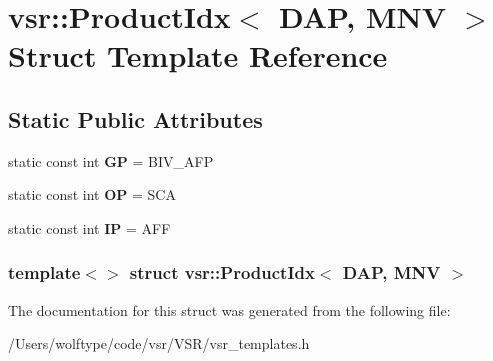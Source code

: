 \hypertarget{structvsr_1_1_product_idx_3_01_d_a_p_00_01_m_n_v_01_4}{\section{vsr\-:\-:Product\-Idx$<$ D\-A\-P, M\-N\-V $>$ Struct Template Reference}
\label{structvsr_1_1_product_idx_3_01_d_a_p_00_01_m_n_v_01_4}
}
\subsection*{Static Public Attributes}
\begin{DoxyCompactItemize}
\item 
\hypertarget{structvsr_1_1_product_idx_3_01_d_a_p_00_01_m_n_v_01_4_ac2e8aabc6ae6cf8a501763a3adcebe10}{static const int {\bfseries G\-P} = B\-I\-V\-\_\-\-A\-F\-P}\label{structvsr_1_1_product_idx_3_01_d_a_p_00_01_m_n_v_01_4_ac2e8aabc6ae6cf8a501763a3adcebe10}

\item 
\hypertarget{structvsr_1_1_product_idx_3_01_d_a_p_00_01_m_n_v_01_4_a236666cd060ecacf8f87864252ea2360}{static const int {\bfseries O\-P} = S\-C\-A}\label{structvsr_1_1_product_idx_3_01_d_a_p_00_01_m_n_v_01_4_a236666cd060ecacf8f87864252ea2360}

\item 
\hypertarget{structvsr_1_1_product_idx_3_01_d_a_p_00_01_m_n_v_01_4_a1596781fd0dac7fd1ba0e2c30095c63f}{static const int {\bfseries I\-P} = A\-F\-F}\label{structvsr_1_1_product_idx_3_01_d_a_p_00_01_m_n_v_01_4_a1596781fd0dac7fd1ba0e2c30095c63f}

\end{DoxyCompactItemize}
\subsubsection*{template$<$$>$ struct vsr\-::\-Product\-Idx$<$ D\-A\-P, M\-N\-V $>$}



The documentation for this struct was generated from the following file\-:\begin{DoxyCompactItemize}
\item 
/\-Users/wolftype/code/vsr/\-V\-S\-R/vsr\-\_\-templates.\-h\end{DoxyCompactItemize}

